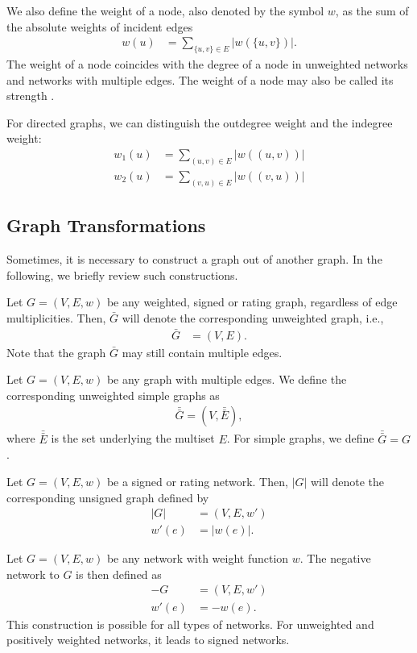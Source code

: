\documentclass{article}
\begin{document}
We also define the weight of a node, also denoted by the symbol $w$, as
the sum of the absolute weights of incident edges
\begin{align}
  w(u) &= \sum_{ \{u,v\} \in E} |w(\{u,v\})|. 
\end{align}
The weight of a node coincides with the degree of a node in unweighted
networks and networks with multiple edges. 
The weight of a node may also be called its strength \citep{b792}. 

For directed graphs, we can distinguish the outdegree weight and the
indegree weight:
\begin{align}
  w_1(u) &= \sum_{(u,v)\in E} |w((u,v))| \\
  w_2(u) &= \sum_{(v,u)\in E} |w((v,u))| 
\end{align}

\subsection{Graph Transformations}
Sometimes, it is necessary to construct a graph out of another graph.
In the following, we briefly review such constructions.  

Let $G=(V,E,w)$ be any weighted, signed or rating graph, regardless of
edge multiplicities.  Then, $\bar G$ will denote the corresponding
unweighted graph, i.e.,
\begin{align}
  \bar G &= (V,E).
\end{align}
Note that the graph $\bar G$ may still contain multiple edges. 

Let $G=(V,E,w)$ be any graph with multiple edges.  We define the
corresponding unweighted simple graphs as
\begin{align}
  \bar{\bar{G}} = (V, \bar{\bar E}),
\end{align}
where $\bar{\bar E}$ is the set underlying the multiset $E$. For simple
graphs, we define $\bar{\bar G} = G$. 

Let $G=(V,E,w)$ be a signed or rating network.  Then, $|G|$ will denote
the corresponding unsigned graph defined by
\begin{align}
  |G| &= (V,E, w') \\
  w'(e) &= |w(e)|. \nonumber
\end{align}

Let $G=(V,E,w)$ be any network with weight function $w$.  The negative
network to $G$ is then defined as
\begin{align}
  -G &= (V, E, w') \\
  w'(e) &= -w(e). \nonumber
\end{align}
This construction is possible for all types of networks. For unweighted
and positively weighted networks, it leads to signed networks. 
\end{document}

